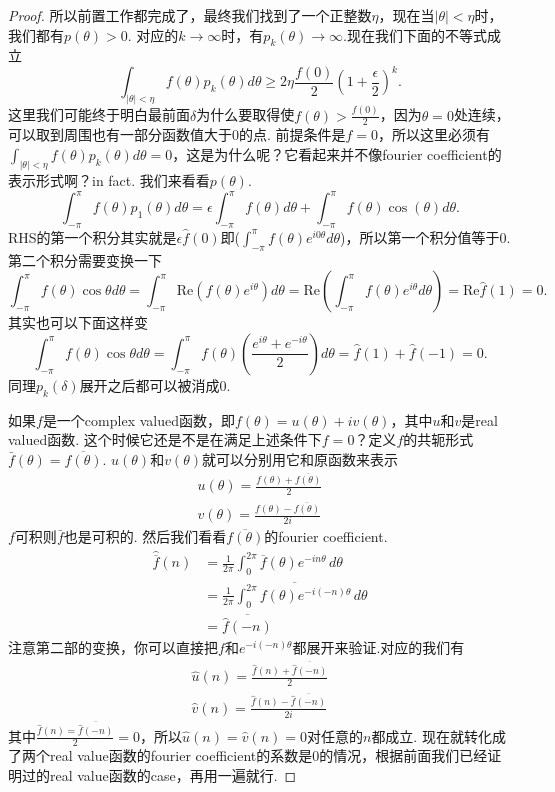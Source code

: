 \documentclass{article}
\begin{document}
\begin{proof}
所以前置工作都完成了，最终我们找到了一个正整数$\eta$，现在当$|\theta| < \eta$时，我们都有$p(\theta)>0$. 对应的$k \rightarrow \infty$时，有$p_k(\theta) \rightarrow \infty.$现在我们下面的不等式成立
$$
\int_{|\theta| < \eta} f(\theta)p_k(\theta)d\theta \geq 2\eta\frac{f(0)}{2}(1+\frac{\epsilon}{2})^k.
$$
这里我们可能终于明白最前面$\delta$为什么要取得使$f(\theta) > \frac{f(0)}{2}$，因为$\theta=0$处连续，可以取到周围也有一部分函数值大于$0$的点. 前提条件是$\widehat{f}=0$，所以这里必须有$\int_{|\theta| < \eta} f(\theta)p_k(\theta)d\theta = 0$，这是为什么呢？它看起来并不像fourier coefficient的表示形式啊？in fact. 我们来看看$p(\theta)$.
$$
\int_{-\pi}^\pi f(\theta)p_1(\theta) d\theta = \epsilon\int_{-\pi}^\pi f(\theta) d\theta + \int_{-\pi}^\pi f(\theta)\cos(\theta) d\theta .
$$
RHS的第一个积分其实就是$\epsilon \widehat{f}(0)$即($\int_{-\pi}^\pi f(\theta)e^{i0\theta} d\theta$)，所以第一个积分值等于$0$. 第二个积分需要变换一下
$$
\int_{-\pi}^\pi f(\theta)\cos\theta d\theta = \int_{-\pi}^\pi \text{Re}(f(\theta)e^{i\theta} )d\theta = \text{Re}\left(\int_{-\pi}^\pi f(\theta)e^{i\theta} d\theta\right) = \text{Re}\hat{f}(1) = 0.
$$
其实也可以下面这样变
$$
\int_{-\pi}^\pi f(\theta)\cos\theta d\theta = \int_{-\pi}^\pi f(\theta)(\frac{e^{i\theta}+e^{-i\theta}}{2})d\theta = \widehat{f}(1) + \widehat{f}(-1) = 0.
$$
同理$p_k(\delta)$展开之后都可以被消成0. 

如果$f$是一个complex valued函数，即$f(\theta)=u(\theta)+iv(\theta)$，其中$u$和$v$是real valued函数. 这个时候它还是不是在满足上述条件下$f=0$？定义$f$的共轭形式$\bar{f}(\theta) = \overline{f(\theta)}.$ $u(\theta)$和$v(\theta)$就可以分别用它和原函数来表示
$$
\begin{aligned}
u(\theta) = \frac{f(\theta)+\overline{f(\theta)}}{2} \\
v(\theta) = \frac{f(\theta)-\overline{f(\theta)}}{2i}
\end{aligned}
$$
$f$可积则$\bar{f}$也是可积的. 然后我们看看$\overline{f(\theta)}$的fourier coefficient.
\begin{align}
\hat{\overline{f}}(n) &= \frac{1}{2\pi} \int_0^{2\pi} \overline{f}(\theta) e^{-in\theta} \,d\theta\\
&= \overline{\frac{1}{2\pi} \int_0^{2\pi} f(\theta) e^{-i(-n)\theta} \,d\theta}\\
&=\overline{\hat{f}(-n)}
\end{align}
注意第二部的变换，你可以直接把$f$和$e^{-i(-n)\theta}$都展开来验证.对应的我们有
$$
\begin{aligned}
\hat{u}(n) = \frac{\hat{f}(n)+\overline{\hat{f}(-n)}}{2} \\
\hat{v}(n) = \frac{\hat{f}(n)-\overline{\hat{f}(-n)}}{2i}
\end{aligned}
$$
其中$\frac{\hat{f}(n) = \overline{\hat{f}(-n)}}{2} = 0$，所以$\hat{u}(n) = \hat{v}(n) = 0$对任意的$n$都成立. 现在就转化成了两个real value函数的fourier coefficient的系数是$0$的情况，根据前面我们已经证明过的real value函数的case，再用一遍就行.


\end{proof}
\end{document}
